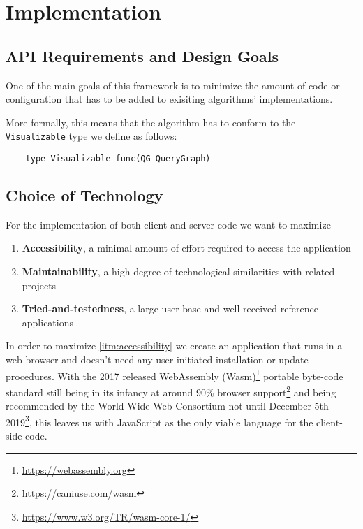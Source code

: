 \section{Implementation}

\subsection{API Requirements and Design Goals}
One of the main goals of this framework is to minimize the amount of code or configuration that has to be added
to exisiting algorithms' implementations.

More formally, this means that the algorithm has to conform to the \texttt{Visualizable} type we define as follows:

\begin{verbatim}
    type Visualizable func(QG QueryGraph)
\end{verbatim}


\subsection{Choice of Technology}

For the implementation of both client and server code we want to maximize

\begin{enumerate}[label={(\roman*)}]
    \item \label{itm:accessibility} \textbf{Accessibility}, a minimal amount of effort required to access the application
    \item \label{itm:maintainability} \textbf{Maintainability}, a high degree of technological similarities with related projects 
    \item \label{itm:testedness} \textbf{Tried-and-testedness}, a large user base and well-received reference applications
\end{enumerate}

In order to maximize \ref{itm:accessibility} we create an application that runs in a web browser and doesn't need any user-initiated installation or update procedures.
With the 2017 released WebAssembly (Wasm)\footnote{\url{https://webassembly.org}} portable byte-code standard still being in its infancy at around 90\% browser support\footnote{\url{https://caniuse.com/wasm}} and being recommended by the World Wide Web Consortium not until December 5th 2019\footnote{\url{https://www.w3.org/TR/wasm-core-1/}}, this leaves us with JavaScript as the only viable language for the client-side code. 

